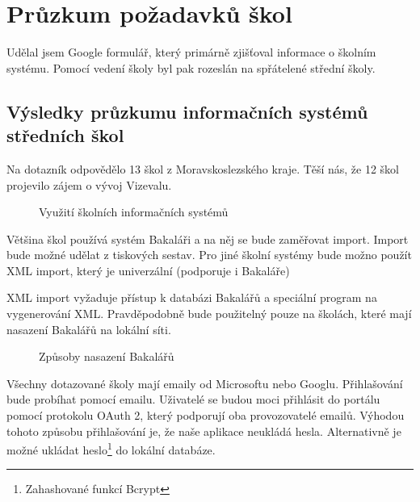 \section{Průzkum požadavků škol}
Udělal jsem Google formulář, který primárně zjišťoval informace o školním systému. Pomocí vedení školy byl pak rozeslán na spřátelené střední školy. 
\subsection{Výsledky průzkumu informačních systémů středních škol}
Na dotazník odpovědělo 13 škol z Moravskoslezského kraje. Těší nás, že 12 škol projevilo zájem o vývoj Vizevalu.

\begin{figure}[H]
    \centering
    \caption{Využití školních informačních systémů}
    \label{fig:vyuziti-skolnich-systemu}
\end{figure}

Většina škol používá systém Bakaláři a na něj se bude zaměřovat import. Import bude možné udělat z tiskových sestav. Pro jiné školní systémy bude možno použít XML import, který je univerzální (podporuje i Bakaláře)




XML import vyžaduje přístup k databázi Bakalářů a speciální program na vygenerování XML. Pravděpodobně bude použitelný pouze na školách, které mají nasazení Bakalářů na lokální síti. 

\begin{figure}[H]
    \centering

    \caption{Způsoby nasazení Bakalářů}
    \label{fig:poskytovatele-emailu}
\end{figure}

Všechny dotazované školy mají emaily od Microsoftu nebo Googlu.
Přihlašování bude probíhat pomocí emailu.
Uživatelé se budou moci přihlásit do portálu pomocí protokolu OAuth 2, který podporují oba provozovatelé emailů.
Výhodou tohoto způsobu přihlašování je, že naše aplikace neukládá hesla.
Alternativně je možné ukládat heslo\footnote{Zahashované funkcí Bcrypt} do lokální databáze.



